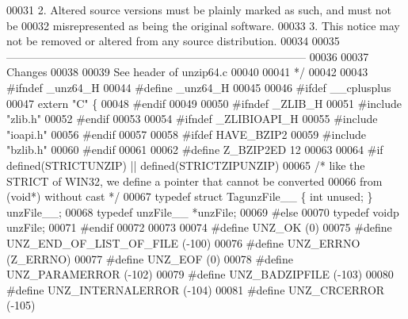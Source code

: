 \begin{DoxyCode}
00031 \textcolor{comment}{  2. Altered source versions must be plainly marked as such, and must not be}
00032 \textcolor{comment}{     misrepresented as being the original software.}
00033 \textcolor{comment}{  3. This notice may not be removed or altered from any source distribution.}
00034 \textcolor{comment}{}
00035 \textcolor{comment}{  ---------------------------------------------------------------------------------}
00036 \textcolor{comment}{}
00037 \textcolor{comment}{        Changes}
00038 \textcolor{comment}{}
00039 \textcolor{comment}{        See header of unzip64.c}
00040 \textcolor{comment}{}
00041 \textcolor{comment}{*/}
00042 
00043 \textcolor{preprocessor}{#ifndef \_unz64\_H}
00044 \textcolor{preprocessor}{#define \_unz64\_H}
00045 
00046 \textcolor{preprocessor}{#ifdef \_\_cplusplus}
00047 \textcolor{keyword}{extern} \textcolor{stringliteral}{"C"} \{
00048 \textcolor{preprocessor}{#endif}
00049 
00050 \textcolor{preprocessor}{#ifndef \_ZLIB\_H}
00051 \textcolor{preprocessor}{#include "zlib.h"}
00052 \textcolor{preprocessor}{#endif}
00053 
00054 \textcolor{preprocessor}{#ifndef  \_ZLIBIOAPI\_H}
00055 \textcolor{preprocessor}{#include "ioapi.h"}
00056 \textcolor{preprocessor}{#endif}
00057 
00058 \textcolor{preprocessor}{#ifdef HAVE\_BZIP2}
00059 \textcolor{preprocessor}{#include "bzlib.h"}
00060 \textcolor{preprocessor}{#endif}
00061 
00062 \textcolor{preprocessor}{#define Z\_BZIP2ED 12}
00063 
00064 \textcolor{preprocessor}{#if defined(STRICTUNZIP) || defined(STRICTZIPUNZIP)}
00065 \textcolor{comment}{/* like the STRICT of WIN32, we define a pointer that cannot be converted}
00066 \textcolor{comment}{    from (void*) without cast */}
00067 \textcolor{keyword}{typedef} \textcolor{keyword}{struct }TagunzFile\_\_ \{ \textcolor{keywordtype}{int} unused; \} unzFile\_\_;
00068 \textcolor{keyword}{typedef} unzFile\_\_ *unzFile;
00069 \textcolor{preprocessor}{#else}
00070 \textcolor{keyword}{typedef} voidp unzFile;
00071 \textcolor{preprocessor}{#endif}
00072 
00073 
00074 \textcolor{preprocessor}{#define UNZ\_OK                          (0)}
00075 \textcolor{preprocessor}{#define UNZ\_END\_OF\_LIST\_OF\_FILE         (-100)}
00076 \textcolor{preprocessor}{#define UNZ\_ERRNO                       (Z\_ERRNO)}
00077 \textcolor{preprocessor}{#define UNZ\_EOF                         (0)}
00078 \textcolor{preprocessor}{#define UNZ\_PARAMERROR                  (-102)}
00079 \textcolor{preprocessor}{#define UNZ\_BADZIPFILE                  (-103)}
00080 \textcolor{preprocessor}{#define UNZ\_INTERNALERROR               (-104)}
00081 \textcolor{preprocessor}{#define UNZ\_CRCERROR                    (-105)}

\end{DoxyCode}
